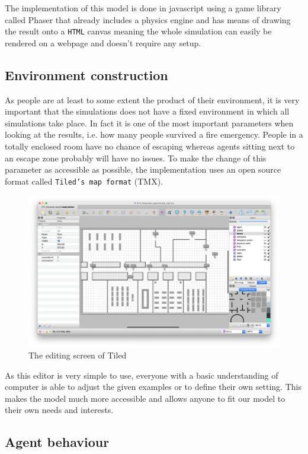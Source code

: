 \documentclass[11pt]{article}
\begin{document}
The implementation of this model is done in javascript using a game library called Phaser that already includes a physics engine and has means of drawing the result onto a \texttt{HTML} canvas meaning the whole simulation can easily be rendered on a webpage and doesn't require any setup.

\subsection{Environment construction}
As people are at least to some extent the product of their environment, it is very important that the simulations does not have a fixed environment in which all simulations take place. In fact it is one of the most important parameters when looking at the results, i.e. how many people survived a fire emergency. People in a totally enclosed room have no chance of escaping whereas agents sitting next to an escape zone probably will have no issues. To make the change of this parameter as accessible as possible, the implementation uses an open source format called \texttt{Tiled's map format} (TMX).

\begin{figure}[H]
	\centering
	\includegraphics[width=1\linewidth]{assets/tiled-editor}\\
	The editing screen of Tiled
\end{figure}

As this editor is very simple to use, everyone with a basic understanding of computer is able to adjust the given examples or to define their own setting. This makes the model much more accessible and allows anyone to fit our model to their own needs and interests.

\subsection{Agent behaviour}
\end{document}
